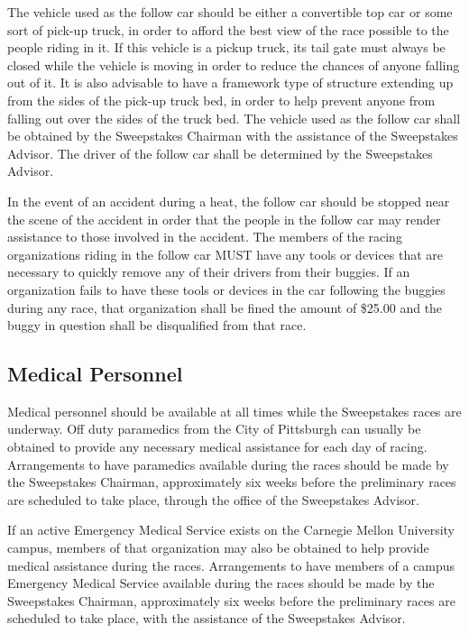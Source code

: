 	The vehicle used as the follow car should be either a convertible top car or
	some sort of pick-up truck, in order to afford the best view of the race
	possible to the people riding in it. If this vehicle is a pickup truck, its
	tail gate must always be closed while the vehicle is moving in order to reduce
	the chances of anyone falling out of it. It is also advisable to have a
	framework type of structure extending up from the sides of the pick-up truck
	bed, in order to help prevent anyone from falling out over the sides of the
	truck bed. The vehicle used as the follow car shall be obtained by the
	Sweepstakes Chairman with the assistance of the Sweepstakes Advisor. The driver
	of the follow car shall be determined by the Sweepstakes Advisor.

	In the event of an accident during a heat, the follow car should be stopped
	near the scene of the accident in order that the people in the follow car may
	render assistance to those involved in the accident. The members of the racing
	organizations riding in the follow car MUST have any tools or devices that are
	necessary to quickly remove any of their drivers from their buggies. If an
	organization fails to have these tools or devices in the car following the
	buggies during any race, that organization shall be fined the amount of \$25.00
	and the buggy in question shall be disqualified from that race.


\subsection{Medical Personnel}

	Medical personnel should be available at all times while the Sweepstakes races
	are underway. Off duty paramedics from the City of Pittsburgh can usually be
	obtained to provide any necessary medical assistance for each day of racing.
	Arrangements to have paramedics available during the races should be made by
	the Sweepstakes Chairman, approximately six weeks before the preliminary races
	are scheduled to take place, through the office of the Sweepstakes Advisor.

	If an active Emergency Medical Service exists on the Carnegie Mellon University
	campus, members of that organization may also be obtained to help provide
	medical assistance during the races. Arrangements to have members of a campus
	Emergency Medical Service available during the races should be made by the
	Sweepstakes Chairman, approximately six weeks before the preliminary races are
	scheduled to take place, with the assistance of the Sweepstakes Advisor.

